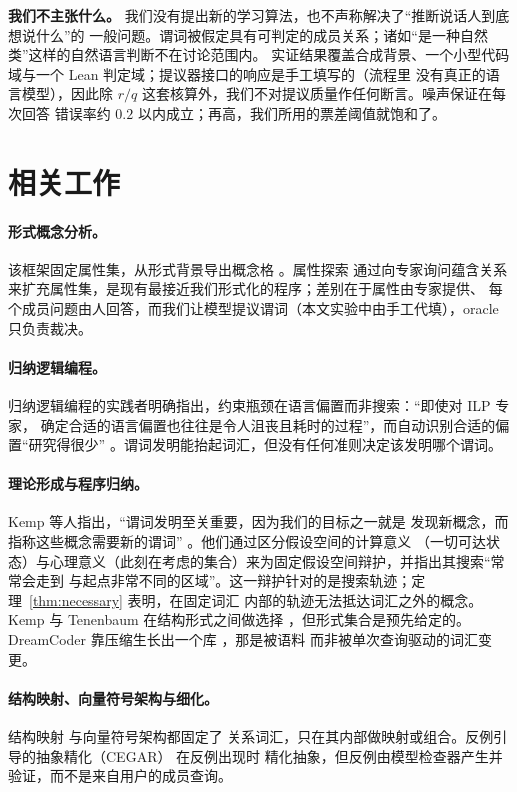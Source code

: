 \documentclass[11pt]{ctexart}
\begin{document}
\textbf{我们不主张什么。} 我们没有提出新的学习算法，也不声称解决了“推断说话人到底想说什么”的
一般问题。谓词被假定具有可判定的成员关系；诸如“是一种自然类”这样的自然语言判断不在讨论范围内。
实证结果覆盖合成背景、一个小型代码域与一个 Lean 判定域；提议器接口的响应是手工填写的（流程里
没有真正的语言模型），因此除 $r/q$ 这套核算外，我们不对提议质量作任何断言。噪声保证在每次回答
错误率约 $0.2$ 以内成立；再高，我们所用的票差阈值就饱和了。

\section{相关工作}

\paragraph{形式概念分析。} 该框架固定属性集，从形式背景导出概念格 \cite{ganter1999}。属性探索
通过向专家询问蕴含关系来扩充属性集，是现有最接近我们形式化的程序；差别在于属性由专家提供、
每个成员问题由人回答，而我们让模型提议谓词（本文实验中由手工代填），oracle 只负责裁决。

\paragraph{归纳逻辑编程。} 归纳逻辑编程的实践者明确指出，约束瓶颈在语言偏置而非搜索：“即使对 ILP 专家，
确定合适的语言偏置也往往是令人沮丧且耗时的过程”，而自动识别合适的偏置“研究得很少”
\cite{cropper2021}。谓词发明能抬起词汇，但没有任何准则决定该发明哪个谓词。

\paragraph{理论形成与程序归纳。} Kemp 等人指出，“谓词发明至关重要，因为我们的目标之一就是
发现新概念，而指称这些概念需要新的谓词” \cite{kemp2010}。他们通过区分假设空间的计算意义
（一切可达状态）与心理意义（此刻在考虑的集合）来为固定假设空间辩护，并指出其搜索“常常会走到
与起点非常不同的区域”。这一辩护针对的是搜索轨迹；定理~\ref{thm:necessary} 表明，在固定词汇
内部的轨迹无法抵达词汇之外的概念。Kemp 与 Tenenbaum 在结构形式之间做选择 \cite{kemp2008}，但形式集合是预先给定的。DreamCoder 靠压缩生长出一个库 \cite{ellis2020}，那是被语料
而非被单次查询驱动的词汇变更。

\paragraph{结构映射、向量符号架构与细化。} 结构映射 \cite{falkenhainer1989} 与向量符号架构都固定了
关系词汇，只在其内部做映射或组合。反例引导的抽象精化（CEGAR）\cite{clarke2000} 在反例出现时
精化抽象，但反例由模型检查器产生并验证，而不是来自用户的成员查询。
\end{document}

